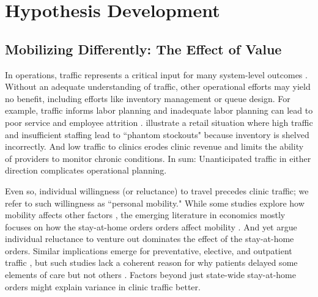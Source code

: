 \section{Hypothesis Development} \label{HD_VC2}
\subsection{Mobilizing Differently: The Effect of Value}
 In operations, traffic represents a critical input for many system-level outcomes \citep[e.g.,][]{Perdikaki2012}. Without an adequate understanding of traffic, other operational efforts may yield no benefit, including efforts like inventory management or queue design. For example, traffic informs labor planning \citep[e.g.,][]{Chuang2015} and inadequate labor planning can lead to poor service and employee attrition \citep{Ton2008}. \cite{Lee2017} illustrate a retail situation where high traffic and insufficient staffing lead to “phantom stockouts" because inventory is shelved incorrectly. And low traffic to clinics \cite[such as documented by][]{Mehrotra2020,Mehrotra2021} erodes clinic revenue and limits the ability of providers to monitor chronic conditions. In sum: Unanticipated traffic in either direction complicates operational planning.
 
 Even so, individual willingness (or reluctance) to travel precedes clinic traffic; we refer to such willingness as “personal mobility." While some studies explore how mobility affects other factors \citep[e.g., the spread of infection in][]{Dave2020}, the emerging literature in economics mostly focuses on how the stay-at-home orders orders affect mobility \citep[review in][]{Gupta2020}. And yet \cite{Goolsbee2020_key} argue individual reluctance to venture out dominates the effect of the stay-at-home orders. Similar implications emerge for preventative, elective, and outpatient traffic \citep{Ziedan2020,Cantor2020}, but such studies lack a coherent reason for why patients delayed some elements of care but not others \citep{Czeisler2020}. Factors beyond just state-wide stay-at-home orders might explain variance in clinic traffic better.
 
